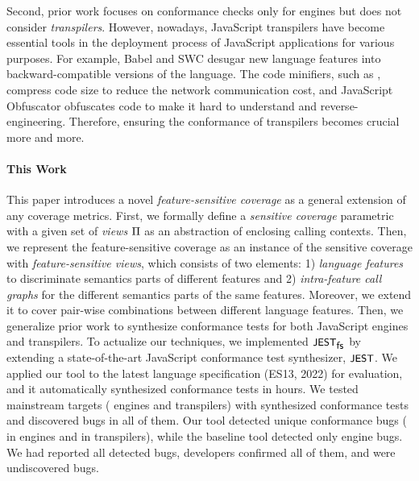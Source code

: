 
Second, prior work focuses on conformance checks only for engines but does not
consider \textit{transpilers}.
%
However, nowadays, JavaScript transpilers have become essential tools in the
deployment process of JavaScript applications for various purposes.
%
For example, Babel and SWC desugar new language features into
backward-compatible versions of the language.
%
The code minifiers, such as , compress code size to reduce the
network communication cost, and JavaScript Obfuscator obfuscates code to make it
hard to understand and reverse-engineering.
%
Therefore, ensuring the conformance of transpilers becomes crucial more and
more.



\paragraph{\textbf{This Work}}

This paper introduces a novel \textit{feature-sensitive coverage} as a general
extension of any coverage metrics.  
%
First, we formally define a \textit{sensitive coverage} parametric with a given
set of \textit{views} $\Pi$ as an abstraction of enclosing calling contexts.
%
Then, we represent the feature-sensitive coverage as an instance of the sensitive
coverage with \textit{feature-sensitive views}, which consists of two elements:
%
1) \textit{language features} to discriminate semantics parts of different
features and 2) \textit{intra-feature call graphs} for the different semantics
parts of the same features.
%
Moreover, we extend it to cover pair-wise combinations between different
language features.
%
Then, we generalize prior work to synthesize conformance tests for both
JavaScript engines and transpilers.
%
To actualize our techniques, we implemented $\textsf{\small JEST}_{\textsf{\small fs}}$ by extending a
state-of-the-art JavaScript conformance test synthesizer, $\textsf{\small JEST}$.
%
We applied our tool to the latest language specification (ES13, 2022) for
evaluation, and it automatically synthesized  conformance tests
in  hours.
%
We tested  mainstream targets ( engines and
 transpilers) with synthesized conformance tests and discovered
bugs in all of them.
%
Our tool detected  unique conformance bugs ( in engines
and  in transpilers), while the baseline tool detected only
 engine bugs.
%
We had reported all detected bugs, developers confirmed all of them, and
 were undiscovered bugs.
%

